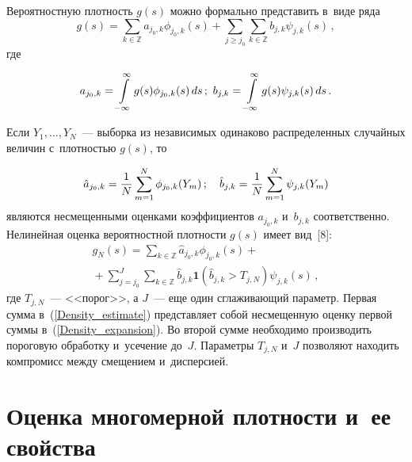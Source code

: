\begin{multicols}{2}
 Вероятностную плотность $g(s)$
можно формально представить в~виде ряда
\begin{equation}
\label{Density_expansion}
g(s)=\sum\limits_{k\in\mathbb{Z}}a_{j_0,k}\phi_{j_0,k}(s)+
\sum\limits_{j\geqslant j_0}\sum\limits_{k\in\mathbb{Z}}b_{j,k}\psi_{j,k}(s)\,,
\end{equation}
где

\noindent
\begin{equation*}
a_{j_0,k}=\int\limits_{-\infty}^{\infty}g(s)\phi_{j_0,k}(s)\,ds\,;\
b_{j,k}\hm=\int\limits_{-\infty}^{\infty}g(s)\psi_{j,k}(s)\,ds\,.
\end{equation*}

Если $Y_1,\ldots,Y_N$~--- выборка из независимых одинаково распределенных
случайных величин с~плотностью $g(s)$, то

\columnbreak

\noindent
\begin{equation*}
\hat{a}_{j_0,k}=\displaystyle\frac{\displaystyle 1\mathstrut}{\displaystyle N\mathstrut}\sum\limits_{m=1}^{N}\phi_{j_0,k}(Y_m)\,;\quad
\hat{b}_{j,k}=\displaystyle\frac{\displaystyle 1\mathstrut}{\displaystyle N\mathstrut}\sum\limits_{m=1}^{N}\psi_{j,k}(Y_m)
\end{equation*}
являются несмещенными оценками коэффициентов $a_{j_0,k}$ и~$b_{j,k}$
соответственно. Нелинейная оценка вероятностной плотности $g(s)$ имеет вид~[8]:
\begin{multline}
g_N(s)=\sum\limits_{k\in\mathbb{Z}}\hat{a}_{j_0,k}\phi_{j_0,k}(s)+{}\\
{}+
\sum\limits_{j=j_0}^{J}\sum\limits_{k\in\mathbb{Z}}\hat{b}_{j,k}\mathbf{1}
\left(\hat{b}_{j,k}>T_{j,N}\right)\psi_{j,k}(s)\,,
\label{Density_estimate}
\end{multline}
где $T_{j,N}$~--- <<порог>>, а $J$~--- еще один сглажива\-ющий параметр.
Первая сумма в~(\ref{Density_estimate}) представляет собой несмещенную
оценку первой суммы в~(\ref{Density_expansion}). Во второй сумме необходимо
производить пороговую обработку и~усечение до~$J$. Параметры $T_{j,N}$ и~$J$
позволяют находить компромисс между смещением и~дисперсией.

\section{Оценка многомерной плотности и~ее свойства}


\end{multicols}
